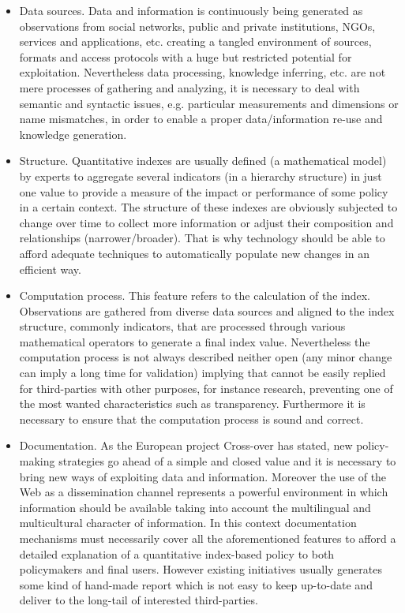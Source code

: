 \begin{itemize}
 \item Data sources. Data and information is continuously being generated as observations from social networks, public and private institutions, NGOs, services and applications, etc. 
 creating a tangled environment of sources, formats and access protocols with a huge but restricted potential for exploitation. Nevertheless data processing, knowledge inferring, etc. are not mere processes 
 of gathering and analyzing, it is necessary to deal with semantic and syntactic issues, e.g. particular measurements and dimensions or name mismatches, 
 in order to enable a proper data/information re-use and knowledge generation.
 
 \item Structure. Quantitative indexes are usually defined (a mathematical model) by experts to aggregate several indicators (in a hierarchy structure) 
 in just one value to provide a measure of the impact or performance of some policy in a certain context. The structure of these indexes are 
 obviously subjected to change over time  to collect more information or adjust their composition and relationships (narrower/broader). 
 That is why technology should be able to afford adequate techniques to automatically populate new changes in an efficient way.
 
  \item Computation process. This feature refers to the calculation of the index. Observations are gathered from diverse data sources and aligned 
  to the index structure, commonly indicators, that are processed through various mathematical operators to generate a final index value. 
  Nevertheless the computation process is not always described neither open (any minor change can imply a long time for validation) implying that 
  cannot be easily replied for third-parties with other purposes, for instance research, preventing one 
  of the most wanted characteristics such as transparency. Furthermore it is necessary to ensure that the computation process 
  is sound and correct.

  \item Documentation. As the European project Cross-over has stated, new policy-making strategies go ahead of a simple and closed value and it is necessary to bring 
  new ways of exploiting data and information. Moreover the use of the Web as a dissemination channel represents a powerful environment in which 
  information should be available taking into account the multilingual and multicultural character of information. In this context documentation mechanisms 
  must necessarily cover all the aforementioned features to afford a detailed explanation of a quantitative index-based policy to both policymakers 
  and final users. However existing initiatives usually generates some kind of hand-made report which is not easy to keep up-to-date and deliver 
  to the long-tail of interested third-parties.
\end{itemize}

